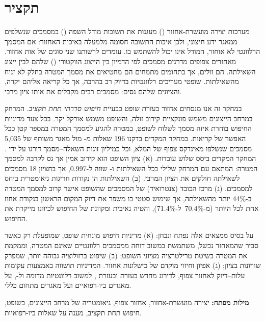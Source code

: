 \section*{תקציר}

מערכות יצירה מועשרת-אחזור () מעגנות את תשובות מודל השפה () במסמכים שנשלפים ממאגר ידע חיצוני, ולכן איכות התשובה חסומה מלמעלה באיכות האחזור: אם המסמך הרלוונטי לא אוחזר, המודל אינו יכול להשתמש בו. עומדים לרשותנו שני סוגים של אות אחזור. מאחזרים צפופים מדרגים מסמכים לפי הדמיון בין הייצוג הווקטורי () שלהם לבין ייצוג השאילתה. הם זולים, אך בתחומים מתמחים הם מחטיאים את מסמך המטרה בחלק לא זניח מהשאילתות. שופטי  מעריכים רלוונטיות בדיוק רב בהרבה, אך כל קריאה אליהם יקרה, והציונים שלהם גסים: מסמכים רבים מקבלים את אותו ציון מרבי.

במחקר זה אנו מנסחים אחזור בעזרת שופט  כבעיית \emph{חיפוש סדרתי תחת תקציב}. המרחק במרחב הייצוגים משמש פונקציית קירוב זולה, והשופט משמש אורקל יקר. בכל צעד מדיניות החיפוש בוחרת איזה מסמך לשלוח לשופט, במטרה להגיע למסמך המטרה במספר קטן ככל האפשר של קריאות. במחקר המקדים בדקנו 196 שאלות מ- מול מאגר משותף של 5,035 מסמכים שנשלפו מאינדקס צפוף של  המלא, וכל כמיליון זוגות השאלה--מסמך דורגו על ידי . המחקר המקדים ביסס שלוש עובדות. (א) ציון השופט הוא קירוב אמין אך גס לקרבה למסמך המטרה: המתאם עם המרחק שלילי בכל השאילתות ו- שווה ל-0.997, אך בחציון 18 מסמכים לשאילתה חולקים את הציון המרבי. (ב) השאילתות הן נקודות חריגות גיאומטרית ביחס למסמכים. (ג) מרכז הכובד (צנטרואיד) של המסמכים שהשופט אישר קרוב למסמך המטרה ב-44\% יותר מהשאילתה, אך שימוש סטטי בו משפר את דיוק המקום הראשון בנקודת אחוז אחת לכל היותר (מ-70.4\%~ל-71.4\%), והטיה נאיבית ומקוונת של החיפוש לכיוונו מייקרת את החיפוש.

על בסיס ממצאים אלה נפתח ונבחן: (א) מדיניות חיפוש מונחית שופט, שמופעלת רק כאשר סביר שהמאחזר נכשל, משתמשת במשוב דוחה ממסמכים רלוונטיים שאינם המטרה, וממקמת את המטרה בשיטת טרילטרציה מציוני השופט; (ב) שיפוט ברזולוציה גבוהה יותר, שמפרק שוויונות בציון; (ג) אפיון וחיזוי מוקדם של כישלונות אחזור. המדיניות תושווה באמצעות עקומות עלות--דיוק לאחזור צפוף, לדירוג מחדש בעזרת  ובעזרת , למשוב רלוונטיות מדומה ול-, על מאגרים ביו-רפואיים ועל מאגרים מתחום כללי.

\vspace{6pt}
\noindent\textbf{מילות מפתח:} יצירה מועשרת-אחזור, אחזור צפוף, גיאומטריה של מרחב הייצוגים,  כשופט, חיפוש תחת תקציב, מענה על שאלות ביו-רפואיות.
